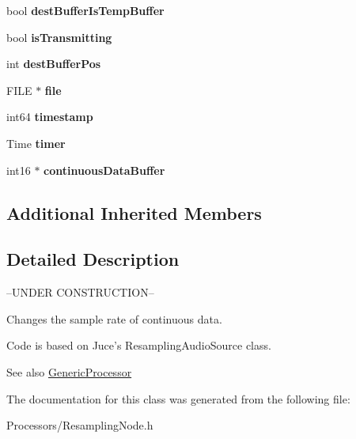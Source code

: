 \begin{DoxyCompactItemize}
\item 
\hypertarget{classResamplingNode_ae4abec313401261b728017a8906b30ad}{bool {\bfseries dest\-Buffer\-Is\-Temp\-Buffer}}\label{classResamplingNode_ae4abec313401261b728017a8906b30ad}

\item 
\hypertarget{classResamplingNode_a2b59f3115c928b57d13d07278a529557}{bool {\bfseries is\-Transmitting}}\label{classResamplingNode_a2b59f3115c928b57d13d07278a529557}

\item 
\hypertarget{classResamplingNode_ad1e104d2967a8192cf32c0100d0a9973}{int {\bfseries dest\-Buffer\-Pos}}\label{classResamplingNode_ad1e104d2967a8192cf32c0100d0a9973}

\item 
\hypertarget{classResamplingNode_a826f8f43016e44c1ef9d1de590f2fa87}{F\-I\-L\-E $\ast$ {\bfseries file}}\label{classResamplingNode_a826f8f43016e44c1ef9d1de590f2fa87}

\item 
\hypertarget{classResamplingNode_a639bf4cd47488ab90226f396a90a7620}{int64 {\bfseries timestamp}}\label{classResamplingNode_a639bf4cd47488ab90226f396a90a7620}

\item 
\hypertarget{classResamplingNode_a5d37e35ee5f83c4d9a2c3d582071f72c}{Time {\bfseries timer}}\label{classResamplingNode_a5d37e35ee5f83c4d9a2c3d582071f72c}

\item 
\hypertarget{classResamplingNode_abfc9d5a8d0cbfa093fbb35a8e24d574c}{int16 $\ast$ {\bfseries continuous\-Data\-Buffer}}\label{classResamplingNode_abfc9d5a8d0cbfa093fbb35a8e24d574c}

\end{DoxyCompactItemize}
\subsection*{Additional Inherited Members}


\subsection{Detailed Description}
--U\-N\-D\-E\-R C\-O\-N\-S\-T\-R\-U\-C\-T\-I\-O\-N--

Changes the sample rate of continuous data.

Code is based on Juce's Resampling\-Audio\-Source class.

\begin{DoxySeeAlso}{See also}
\hyperlink{classGenericProcessor}{Generic\-Processor} 
\end{DoxySeeAlso}


The documentation for this class was generated from the following file\-:\begin{DoxyCompactItemize}
\item 
Processors/Resampling\-Node.\-h\end{DoxyCompactItemize}
